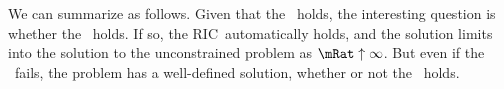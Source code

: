 \documentclass[../BufferStockTheory.tex]{subfiles}
\begin{document}
\begin{comment}
We can obtain a more exact approximation to the correct ${n}$ by defining
\begin{align}
\nabla(n) \equiv   \lim_{n \rightarrow \infty}\Rnorm^{n}\mathbb{C}_{t-n}^{t}-\Rnorm^{n}\mathbb{C}_{t-n}^{t}  & =  \left(\frac{\PatR^{-n}}{1-\PatR}\right).
\end{align}
from which we can obtain the difference between the approximate and the exact $\mathbb{C}_{t-n}^{t}$ as $\Rnorm^{-n}\nabla(n)$ and


For this $n$ and
$\bRat$ we can obtain the corresponding
$\cRat=\PatPGro^{-\nFunc(\bRat)}$.  Note, however, that this is {\it not}
the level of $\cRat$ directly associated with $\bRat$ on the true
consumption function, because we used only a limiting approximation to
the correct $n$ rather than the correct $n$.

Our strategy, in this case, is

The limiting difference can be obtained by realizing that
\begin{align}
\nabla(n) \equiv   \lim_{n \rightarrow \infty}\Rnorm^{n}\mathbb{C}_{t-n}^{t}-\Rnorm^{n}\mathbb{C}_{t-n}^{t}  & =  \left(\frac{\PatR^{-n}}{1-\PatR}\right).
\end{align}
and so

\end{comment}

We can summarize as follows.  Given that the \PFGIC~holds, the
interesting question is whether the \FHWC~holds.  If so, the
RIC~automatically holds, and the solution limits
into the solution to the unconstrained problem as $\mRat \uparrow
\infty$.  But even if the \FHWC~fails, the problem has a
well-defined solution, whether or not the \RIC~holds.
\end{document}
